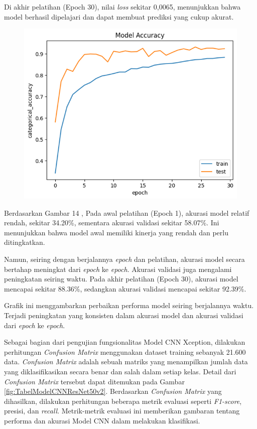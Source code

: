 Di akhir pelatihan (Epoch 30), nilai \textit{loss} sekitar 0,0065, menunjukkan bahwa model berhasil dipelajari dan dapat membuat prediksi yang cukup akurat.  

\begin{figure}[!hbt]
	\centering
	\includegraphics[width=0.7\linewidth]{gambar/bener/Accuracy_ModelXception.png}
	\label{fig:akurasiModelCNNXception}
\end{figure}
Berdasarkan Gambar 14 , Pada awal pelatihan (Epoch 1), akurasi model relatif rendah, sekitar 34.20\%, sementara akurasi validasi sekitar 58.07\%. Ini menunjukkan bahwa model awal memiliki kinerja yang rendah dan perlu ditingkatkan.

Namun, seiring dengan berjalannya\textit{ epoch} dan pelatihan, akurasi model secara bertahap meningkat dari\textit{ epoch} ke\textit{ epoch}. Akurasi validasi juga mengalami peningkatan seiring waktu. Pada akhir pelatihan (Epoch 30), akurasi model mencapai sekitar 88.36\%, sedangkan akurasi validasi mencapai sekitar 92.39\%.

Grafik ini menggambarkan perbaikan performa model seiring berjalannya waktu. Terjadi peningkatan yang konsisten dalam akurasi model dan akurasi validasi dari\textit{ epoch} ke\textit{ epoch}.

Sebagai bagian dari pengujian fungsionalitas Model CNN Xception, dilakukan perhitungan \textit{Confusion Matrix} menggunakan dataset training sebanyak 21.600 data. \textit{Confusion Matrix} adalah sebuah matriks yang menampilkan jumlah data yang diklasifikasikan secara benar dan salah dalam setiap kelas. Detail dari \textit{Confusion Matrix} tersebut dapat ditemukan pada Gambar \ref{fig:TabelModelCNNResNet50v2}. Berdasarkan \textit{Confusion Matrix} yang dihasilkan, dilakukan perhitungan beberapa metrik evaluasi seperti \textit{F1-score}, presisi, dan \textit{recall}. Metrik-metrik evaluasi ini memberikan gambaran tentang performa dan akurasi Model CNN dalam melakukan klasifikasi.

